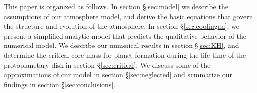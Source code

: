 \documentclass[apj, numberedappendix]{emulateapj}
\begin{document}





This paper is organized as follows. In section \S\ref{sec:model} we describe the assumptions of our atmosphere model, and derive the basic equations that govern the structure and evolution of the atmosphere. In section \S\ref{sec:coolingan}, we present a simplified analytic model that predicts the qualitative behavior of the numerical model. We describe our numerical results in section \S\ref{sec:KH}, and determine the critical core mass for planet formation during the life time of the protoplanetary disk in section \S\ref{sec:critical}.  We discuss some of the approximations of our model in section \S\ref{sec:neglected} and summarize our findings in section \S\ref{sec:conclusions}.

\end{document}
